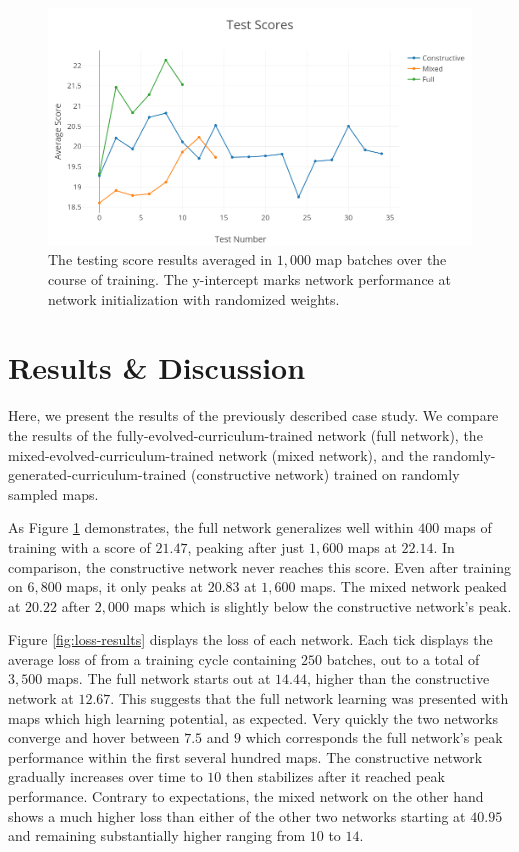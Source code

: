 \documentclass[letterpaper]{article} %
\begin{document}
\begin{figure}[!htb]
\begin{center}
\includegraphics[width=1.0\linewidth]{graphics/test-scores.png}
\caption{The testing score results averaged in $1,000$ map batches over the course of training. The y-intercept marks network performance at network initialization with randomized weights.}
\label{fig:testing-results}
\end{center}
\end{figure}

\section{Results \& Discussion}\label{sec:results/discussion}
Here, we present the results of the previously described case study. We compare the results of the fully-evolved-curriculum-trained network (full network), the mixed-evolved-curriculum-trained network (mixed network), and the randomly-generated-curriculum-trained (constructive network) trained on randomly sampled maps.


As Figure \ref{fig:testing-results} demonstrates, the full network generalizes well within $400$ maps of training with a score of $21.47$, peaking after just $1,600$ maps at $22.14$. In comparison, the constructive network never reaches this score. Even after training on $6,800$ maps, it only peaks at $20.83$ at $1,600$ maps. The mixed network peaked at $20.22$ after $2,000$ maps which is slightly below the constructive network's peak.


Figure \ref{fig:loss-results} displays the loss of each network. Each tick displays the average loss of from a training cycle containing $250$ batches, out to a total of $3,500$ maps. The full network starts out at $14.44$, higher than the constructive network at $12.67$. This suggests that the full network learning was presented with maps which high learning potential, as expected. Very quickly the two networks converge and hover between $7.5$ and $9$ which corresponds the full network's peak performance within the first several hundred maps. The constructive network gradually increases over time to $10$ then stabilizes after it reached peak performance. Contrary to expectations, the mixed network on the other hand shows a much higher loss than either of the other two networks starting at $40.95$ and remaining substantially higher ranging from $10$ to $14$.
\end{document}
